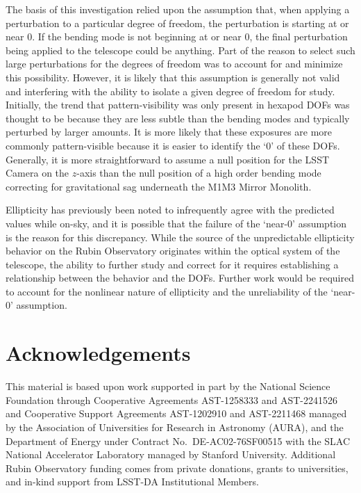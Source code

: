 \documentclass[SE,lsstdraft,authoryear,toc]{lsstdoc}
\begin{document}
The basis of this investigation relied upon the assumption that, when applying a perturbation to a particular degree of freedom, the perturbation is starting at or near 0. 
If the bending mode is not beginning at or near 0, the final perturbation being applied to the telescope could be anything. 
Part of the reason to select such large perturbations for the degrees of freedom was to account for and minimize this possibility. 
However, it is likely that this assumption is generally not valid and interfering with the ability to isolate a given degree of freedom for study. 
Initially, the trend that pattern-visibility was only present in hexapod DOFs was thought to be because they are less subtle than the bending modes and typically perturbed by larger amounts. 
It is more likely that these exposures are more commonly pattern-visible because it is easier to identify the `0' of these DOFs. 
Generally, it is more straightforward to assume a null position for the LSST Camera on the $z$-axis than the null position of a high order bending mode correcting for gravitational sag underneath the M1M3 Mirror Monolith. 

Ellipticity has previously been noted to infrequently agree with the predicted values while on-sky, and it is possible that the failure of the `near-0' assumption is the reason for this discrepancy. 
While the source of the unpredictable ellipticity behavior on the Rubin Observatory originates within the optical system of the telescope, the ability to further study and correct for it requires establishing a relationship between the behavior and the DOFs. 
Further work would be required to account for the nonlinear nature of ellipticity and the unreliability of the `near-0' assumption. 

\clearpage

\appendix

\section{Acknowledgements}

This material is based upon work supported in part by the National Science Foundation through Cooperative Agreements AST-1258333 and AST-2241526 and Cooperative Support Agreements AST-1202910 and AST-2211468 managed by the Association of Universities for Research in Astronomy (AURA), and the Department of Energy under Contract No.\ DE-AC02-76SF00515 with the SLAC National Accelerator Laboratory managed by Stanford University.
Additional Rubin Observatory funding comes from private donations, grants to universities, and in-kind support from LSST-DA Institutional Members.
\end{document}
